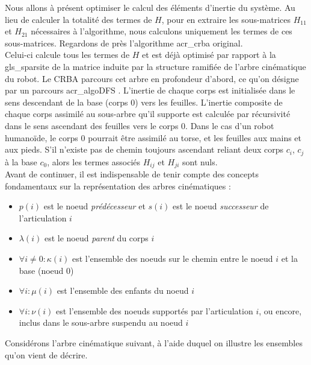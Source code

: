 \documentclass{report}
\begin{document}
Nous allons à présent optimiser le calcul des éléments d'inertie du système. Au lieu de calculer la totalité des termes de $H$, pour en extraire les sous-matrices $H_{11}$ et $H_{21}$ nécessaires à l'algorithme, nous calculons uniquement les termes de ces sous-matrices. Regardons de près l'algorithme \gls{acr_crba} original.\\
Celui-ci calcule tous les termes de $H$ et est déjà optimisé par rapport à la \gls{gls_sparsite} de la matrice induite par la structure ramifiée de l'arbre cinématique du robot. Le CRBA parcours cet arbre en profondeur d'abord, ce qu'on désigne par un parcours \gls{acr_algoDFS} \cite{bib_deepFirstSearch}. L'inertie de chaque corps est initialisée dans le sens descendant de la base (corps 0) vers les feuilles. L'inertie composite de chaque corps assimilé au sous-arbre qu'il supporte est calculée par récursivité dans le sens ascendant des feuilles vers le corps 0. Dans le cas d'un robot humanoïde, le corps 0 pourrait être assimilé au torse, et les feuilles aux mains et aux pieds. S'il n'existe pas de chemin toujours ascendant reliant deux corps $c_i$, $c_j$ à la base $c_0$, alors les termes associés $H_{ij}$ et $H_{ji}$ sont nuls.\\
Avant de continuer, il est indispensable de tenir compte des concepts fondamentaux sur la représentation des arbres cinématiques \cite{ch_algSpa_equationMouvement}:

\begin{itemize}
\item $p(i)$ est le noeud \emph{prédécesseur} et $s(i)$ est le noeud \emph{successeur} de l'articulation $i$
\item $\lambda(i)$ est le noeud \emph{parent} du corps $i$
\item $\forall i \neq 0: \kappa(i)$ est l'ensemble des noeuds sur le chemin entre le noeud $i$ et la base (noeud $0$)
\item $\forall i: \mu (i)$  est l'ensemble des enfants du noeud $i$
\item $\forall i: \nu (i)$  est l'ensemble des noeuds supportés par l'articulation $i$, ou encore, inclus dans le sous-arbre suspendu au noeud $i$
\end{itemize}

Considérons l'arbre cinématique suivant, à l'aide duquel on illustre les ensembles qu'on vient de décrire.\\
\end{document}
